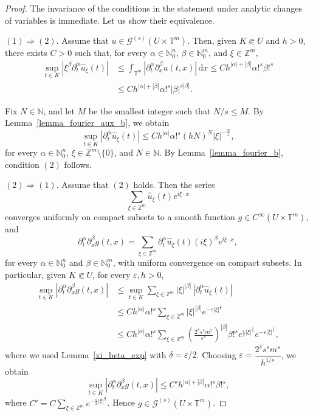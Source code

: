 \documentclass[11pt,reqno]{amsart}
\numberwithin{equation}{section}
\begin{document}
\begin{proof} The invariance of the conditions in the statement under
analytic changes of variables is immediate. Let us show their equivalence.

	\noindent
	\((1)\Rightarrow(2)\).
	Assume that \(u\in\mathscr{G}^{(s)}(U\times\mathbb{T}^m)\).
	Then, given \(K\Subset U\) and \(h>0\), there exists \(C>0\) such that, for every \(\alpha\in\mathbb{N}_0^n\), \(\beta\in\mathbb{N}_0^m\), and \(\xi\in\mathbb{Z}^m\),
	\begin{align*}
		\sup_{t\in K}|\xi^\beta\partial_t^\alpha\widehat{u}_\xi(t)|
		&\leq
		\int_{\mathbb{T}^m}|\partial_t^\alpha\partial_x^\beta u(t,x)|\,\mathrm{d}x
		\leq
		Ch^{|\alpha|+|\beta|}\alpha!^s\beta!^s\\
		&\leq
		Ch^{|\alpha|+|\beta|}\alpha!^s|\beta|^{s|\beta|}.
	\end{align*}
	
	Fix \(N\in\mathbb{N}\), and let \(M\) be the smallest integer such that \(N/s\leq M\).
	By Lemma~\ref{lemma_fourier_aux_b}, we obtain
	\[
	\sup_{t\in K}|\partial_t^\alpha\widehat{u}_\xi(t)|
	\leq
	Ch^{|\alpha|}\alpha!^s(hN)^N|\xi|^{-\frac{N}{s}},
	\]
	for every \(\alpha\in\mathbb{N}_0^n\), \(\xi\in\mathbb{Z}^m\setminus\{0\}\), and \(N\in\mathbb{N}\).
	By Lemma~\ref{lemma_fourier_b}, condition \((2)\) follows.
	
	\medskip
	\noindent
	\((2)\Rightarrow(1)\).
	Assume that \((2)\) holds.
	Then the series
	\[
	\sum_{\xi\in\mathbb{Z}^m}\widehat{u}_\xi(t)e^{i\xi\cdot x}
	\]
	converges uniformly on compact subsets to a smooth function \(g\in C^\infty(U\times\mathbb{T}^m)\), and
	\[
	\partial_t^\alpha\partial_x^\beta g(t,x)
	=
	\sum_{\xi\in\mathbb{Z}^m}\partial_t^\alpha\widehat{u}_\xi(t)(i\xi)^\beta e^{i\xi\cdot x},
	\]
	for every \(\alpha\in\mathbb{N}_0^n\) and \(\beta\in\mathbb{N}_0^m\), with uniform convergence on compact subsets.
	In particular, given \(K\Subset U\), for every \(\varepsilon,h>0\),
	\begin{align*}
		\sup_{t\in K}|\partial_t^\alpha\partial_x^\beta g(t,x)|
		&\leq
		\sup_{t\in K}\sum_{\xi\in\mathbb{Z}^m}|\xi|^{|\beta|}\,|\partial_t^\alpha\widehat{u}_\xi(t)|\\
		&\leq
		Ch^{|\alpha|}\alpha!^s\sum_{\xi\in\mathbb{Z}^m}|\xi|^{|\beta|}e^{-\varepsilon|\xi|^{\frac{1}{s}}}\\
		&\leq
		Ch^{|\alpha|}\alpha!^s\sum_{\xi\in\mathbb{Z}^m}\left(\frac{2^ss^sm^s}{\varepsilon^s}\right)^{|\beta|}\beta!^s
		e^{\frac{\varepsilon}{2}|\xi|^{\frac{1}{s}}}e^{-\varepsilon|\xi|^{\frac{1}{s}}},
	\end{align*}
	where we used Lemma~\ref{xi_beta_exp} with \(\delta=\varepsilon/2\).
	Choosing \(\varepsilon=\dfrac{2^ss^sm^s}{h^{1/s}}\), we obtain
	\[
	\sup_{t\in K}|\partial_t^\alpha\partial_x^\beta g(t,x)|
	\leq
	C'h^{|\alpha|+|\beta|}\alpha!^s\beta!^s,
	\]
	where \(C'=C\sum_{\xi\in\mathbb{Z}^m}e^{-\frac{\varepsilon}{2}|\xi|^{\frac{1}{s}}}\).
	Hence \(g\in\mathscr{G}^{(s)}(U\times\mathbb{T}^m)\).
	

\end{proof}
\end{document}
